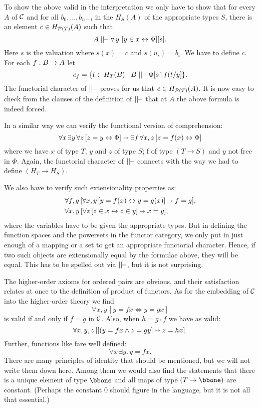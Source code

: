 To show the above valid in the interpretation we only have to show that for every $A$ of
$\C$ and for all $b_0, \dots ,b_{n-l}$ in the $H_S(A)$ of the appropriate types $S$, there
is an element $c \in H_{\P(T)}(A)$ such that
$$
A \mm \forall\, y \,\, [y \in x \iff \Phi][s] .
$$
%
Here $s$ is the valuation where $s(x) = c$ and $s(u_i) = b_i$. We have to define $c$. For
each $f: \BA$ let
$$
c_f = \{t \in H_T(B) \mid B \mm \Phi [s \res f(t/y] \} .
$$
%
The functorial character of $\mm$ proves for us that $c \in H_{\P(T)}(A)$. It is now easy
to check from the clauses of the definition of $\mm$ that at $A$ the above formula is
indeed forced.

In a similar way we can verify the functional version of comprehension:
$$
\forall x \, \exists y \, \forall z \, [ z = y \iff \Phi] \imp \exists f\, \forall x,z\, [z = f(x) \iff \Phi ]
$$
%
where we have $x$ of type $T$, $y$ and $z$ of type $S$; f of type $(T\to S)$ and $y$ not
free in $\Phi$. Again, the functorial character of $\mm$ connects with the way we had to
define $(H_T \to H_S)$.

We also have to verify such extensionality properties as:
\begin{align*}
&\forall f,g \, [\forall x,y \, [ y = f(x) \iff y = g(x) ] \imp f = g],\\
&\forall x,y \, [\forall z \, [ z \in x \iff z \in y ] \imp x = y],
\end{align*}
%
where the variables have to be given the appropriate types. But in defining the function
spaces and the powersets in the functor category, we only put in just enough of a mapping
or a set to get an appropriate functorial character. Hence, if two such objects are
extensionally equal by the formulae above, they will be equal. This has to be spelled out
via $\mm$, but it is not surprising.

The higher-order axioms for ordered pairs are obvious, and their satisfaction relates at
once to the definition of product of functors. As for the embedding of $\C$ into the
higher-order theory we find
$$
\forall x,y \, [y = f x \iff y = gx]
$$
is valid if and only if $f = g$ in $\C$. Also, when $h = g \comp f$ we have as valid:
$$
\forall x,y,z\, [[(y = fx \land z = gy] \imp z = hx].
$$
Further, functions like fare well defined:
$$
\forall x\, \exists y.\, y = fx .
$$
There are many principles of identity that should be mentioned, but we will not write
them down here. Among them we would also find the statements that there is a unique
element of type $\bbone$ and all maps of type $(T\to \bbone )$ are constant. (Perhaps the
constant 0 should figure in the language, but it is not all that essential.)

